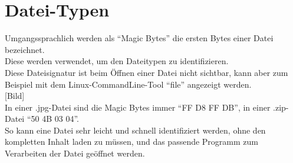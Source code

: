 \section{Datei-Typen}\label{sec:datei-typen}

Umgangssprachlich werden als “Magic Bytes” die ersten Bytes einer Datei bezeichnet.\\
Diese werden verwendet, um den Dateitypen zu identifizieren.\\

Diese Dateisignatur ist beim Öffnen einer Datei nicht sichtbar, kann aber zum Beispiel mit dem Linux-CommandLine-Tool “file” angezeigt werden.\\

[Bild]\\

In einer .jpg-Datei sind die Magic Bytes immer “FF D8 FF DB”, in einer .zip-Datei “50 4B 03 04”.\\
So kann eine Datei sehr leicht und schnell identifiziert werden, ohne den kompletten Inhalt laden zu müssen, und das passende Programm zum Verarbeiten der Datei geöffnet werden.